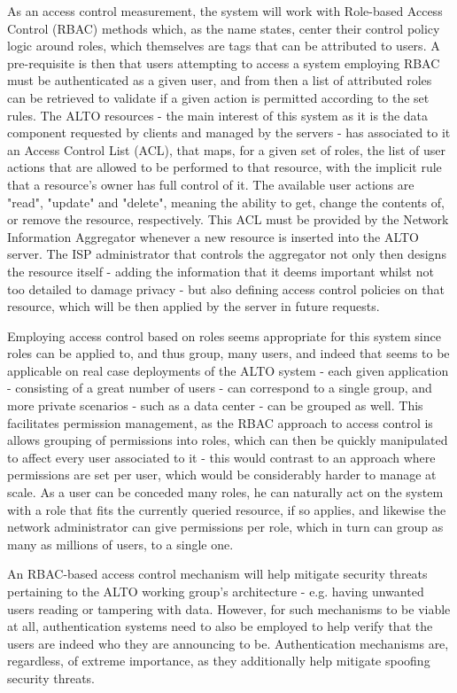     As an access control measurement, the system will work with Role-based Access Control (RBAC) methods which, as the name states, center their control policy logic around roles, which themselves are tags that can be attributed to users.
    A pre-requisite is then that users attempting to access a system employing RBAC must be authenticated as a given user, and from then a list of attributed roles can be retrieved to validate if a given action is permitted according to the set rules.
    The ALTO resources - the main interest of this system as it is the data component requested by clients and managed by the servers - has associated to it an Access Control List (ACL), that maps, for a given set of roles, the list of user actions that are allowed to be performed to that resource, with the implicit rule that a resource's owner has full control of it.
    The available user actions are "read", "update" and "delete", meaning the ability to get, change the contents of, or remove the resource, respectively.
    This ACL must be provided by the Network Information Aggregator whenever a new resource is inserted into the ALTO server.
    The ISP administrator that controls the aggregator not only then designs the resource itself - adding the information that it deems important whilst not too detailed to damage privacy - but also defining access control policies on that resource, which will be then applied by the server in future requests.

    Employing access control based on roles seems appropriate for this system since roles can be applied to, and thus group, many users, and indeed that seems to be applicable on real case deployments of the ALTO system - each given application - consisting of a great number of users - can correspond to a single group, and more private scenarios - such as a data center - can be grouped as well.
    This facilitates permission management, as the RBAC approach to access control is allows grouping of permissions into roles, which can then be quickly manipulated to affect every user associated to it - this would contrast to an approach where permissions are set per user, which would be considerably harder to manage at scale.
    As a user can be conceded many roles, he can naturally act on the system with a role that fits the currently queried resource, if so applies, and likewise the network administrator can give permissions per role, which in turn can group as many as millions of users, to a single one.

    An RBAC-based access control mechanism will help mitigate security threats pertaining to the ALTO working group's architecture - e.g. having unwanted users reading or tampering with data.
    However, for such mechanisms to be viable at all, authentication systems need to also be employed to help verify that the users are indeed who they are announcing to be.
    Authentication mechanisms are, regardless, of extreme importance, as they additionally help mitigate spoofing security threats.


